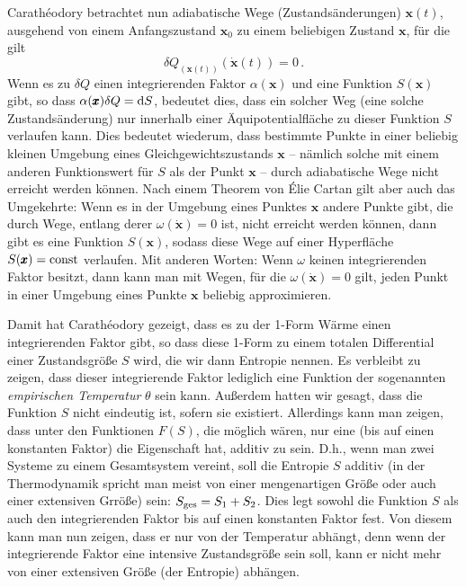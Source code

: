 Carath\'{e}odory
betrachtet nun adiabatische Wege (Zustands\"anderungen) $\pmb{x}(t)$, ausgehend von einem Anfangszustand
$\pmb{x}_0$ zu einem beliebigen Zustand $\pmb{x}$, f\"ur die gilt
\begin{equation}
                          \delta Q_{(\pmb{x}(t))}(\dot{\pmb{x}}(t))  = 0 \, . 
\end{equation}
Wenn es zu $\delta Q$ einen integrierenden Faktor $\alpha(\pmb{x})$ und eine Funktion $S(\pmb{x})$
gibt, so dass $\alpha(\pmb{x}) \delta Q = {\rm d}S$, bedeutet dies, dass ein solcher Weg
(eine solche Zustands\"anderung) nur innerhalb einer \"Aquipotentialfl\"ache zu dieser Funktion $S$ verlaufen
kann. Dies bedeutet wiederum, dass bestimmte Punkte in einer beliebig kleinen Umgebung eines
Gleichgewichtszustands $\pmb{x}$ -- n\"amlich solche mit einem anderen Funktionswert f\"ur $S$ als der Punkt $\pmb{x}$ --
durch adiabatische Wege nicht erreicht werden k\"onnen. Nach einem Theorem von \'{E}lie Cartan
gilt aber auch das Umgekehrte: Wenn es in der Umgebung eines Punktes $\pmb{x}$ andere
Punkte gibt, die durch Wege, entlang derer $\omega(\dot{\pmb{x}})=0$ ist, nicht erreicht werden
k\"onnen, dann gibt es eine Funktion $S(\pmb{x})$, sodass diese Wege auf einer Hyperfl\"ache 
$S(\pmb{x})={\rm const}$ verlaufen. Mit anderen Worten: Wenn $\omega$ keinen integrierenden Faktor
besitzt, dann kann man mit Wegen, f\"ur die $\omega(\dot{\pmb{x}})=0$ gilt, jeden Punkt in einer
Umgebung eines Punkte $\pmb{x}$ beliebig approximieren. 

Damit hat Carath\'{e}odory gezeigt, dass es zu der 1-Form W\"arme einen integrierenden Faktor gibt,
so dass diese 1-Form zu einem totalen Differential einer Zustandsgr\"o\ss e $S$ wird, die wir dann
Entropie nennen. Es verbleibt zu zeigen, dass dieser integrierende Faktor lediglich eine Funktion der
sogenannten \textit{empirischen Temperatur} $\theta$ sein kann. Au\ss erdem hatten wir gesagt, dass
die Funktion $S$ nicht eindeutig ist, sofern sie existiert. Allerdings kann man zeigen, dass unter den
Funktionen $F(S)$, die m\"oglich w\"aren, nur eine (bis auf einen konstanten Faktor) die Eigenschaft
hat, additiv zu sein. D.h., wenn man zwei Systeme zu einem Gesamtsystem vereint, soll die
Entropie $S$ additiv (in der Thermodynamik spricht man meist von einer mengenartigen Gr\"o\ss e
oder auch einer extensiven Grr\"o\ss e) 
sein: $S_{\rm ges} = S_1 + S_2$. Dies legt sowohl die Funktion $S$ als auch
den integrierenden Faktor bis auf einen konstanten Faktor fest. Von diesem kann man nun zeigen,
dass er nur von der Temperatur abh\"angt, denn wenn der integrierende Faktor eine intensive
Zustandsgr\"o\ss e sein soll, kann er nicht mehr von einer extensiven Gr\"o\ss e (der Entropie) 
abh\"angen. 

